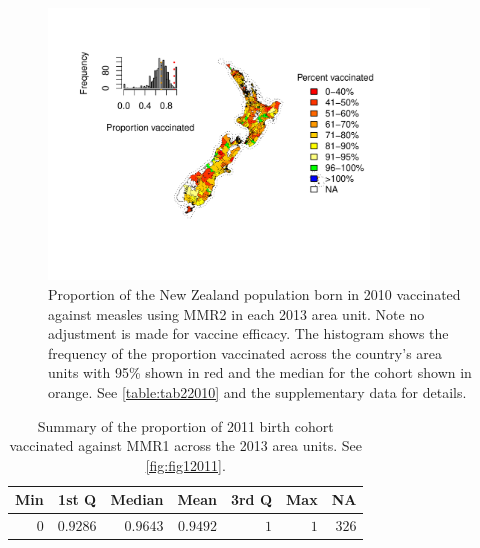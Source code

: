 \documentclass{article}
\begin{document}
\begin{figure}
\begin{center}
    \includegraphics[width=0.9\textwidth]{nir_census_MMR2_NIR_2010.pdf}
 \end{center}
    \caption{Proportion of the New Zealand population born in 2010 vaccinated against measles using MMR2 in each 2013 area unit. Note no adjustment is made for vaccine efficacy. The histogram shows the frequency of the proportion vaccinated across the country's area units with 95\% shown in red and the median for the cohort shown in orange. See \autoref{table:tab22010} and the supplementary data for details.}
\label{fig:fig22010}
\end{figure}

 \vspace{5mm} %
\begin{table}
\begin{center}
\begin{tabular}{rrrrrrr}
\hline\hline
\multicolumn{1}{c}{Min}&\multicolumn{1}{c}{1st Q}&\multicolumn{1}{c}{Median}&\multicolumn{1}{c}{Mean}&\multicolumn{1}{c}{3rd Q}&\multicolumn{1}{c}{Max}&\multicolumn{1}{c}{NA}\tabularnewline
\hline
$0$&$0.9286$&$0.9643$&$0.9492$&$1$&$1$&$326$\tabularnewline
\hline
\end{tabular}\end{center}\caption{Summary of the proportion of 2011 birth cohort vaccinated against MMR1 across the 2013 area units. See \autoref{fig:fig12011}.}
\label{table:tab12011}
\end{table}
\end{document}
